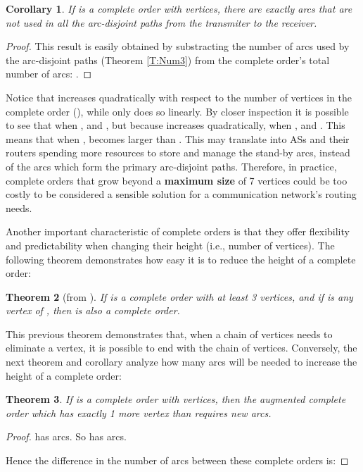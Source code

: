 \documentclass[5p,twocolumn]{elsarticle}
\newtheorem{theorem}{Theorem}
\newtheorem{corollary}[theorem]{Corollary}
\begin{document}
\begin{corollary}\label{T:Num4}
If  is a complete order with  vertices, there are exactly  arcs that are not used in all the  arc-disjoint paths from the transmiter to the receiver.
\end{corollary}

\begin{proof}
This result is easily obtained by substracting the number of arcs used by the  arc-disjoint paths (Theorem \ref{T:Num3}) from the complete order's total number of arcs: .
\end{proof}

Notice that  increases quadratically with respect to the number of vertices in the complete order (), while  only does so linearly. By closer inspection it is possible to see that when ,  and , but because  increases quadratically, when ,  and . This means that when ,  becomes larger than . This may translate into ASs and their routers spending more resources to store and manage the  stand-by arcs, instead of the  arcs which form the primary arc-disjoint paths. Therefore, in practice, complete orders that grow beyond a \textbf{maximum size} of 7 vertices could be too costly to be considered a sensible solution for a communication network's routing needs.

Another important characteristic of complete orders is that they offer flexibility and predictability when changing their height (i.e., number of vertices). The following theorem demonstrates how easy it is to reduce the height of a complete order:

\begin{theorem}[from \cite{Harary1965}]\label{T:Num5}
If  is a complete order with at least 3 vertices, and if  is any vertex of , then  is also a complete order.
\end{theorem}

This previous theorem demonstrates that, when a chain of  vertices needs to eliminate a vertex, it is possible to end with the chain of  vertices. Conversely, the next theorem and corollary analyze how many arcs will be needed to increase the height of a complete order:

\begin{theorem}\label{T:Num6}
If  is a complete order with  vertices, then the augmented complete order  which has exactly 1 more vertex than  requires  new arcs.
\end{theorem}

\begin{proof}
 has  arcs. So  has  arcs.

Hence the difference in the number of arcs between these complete orders is:

\end{proof}
\end{document}
